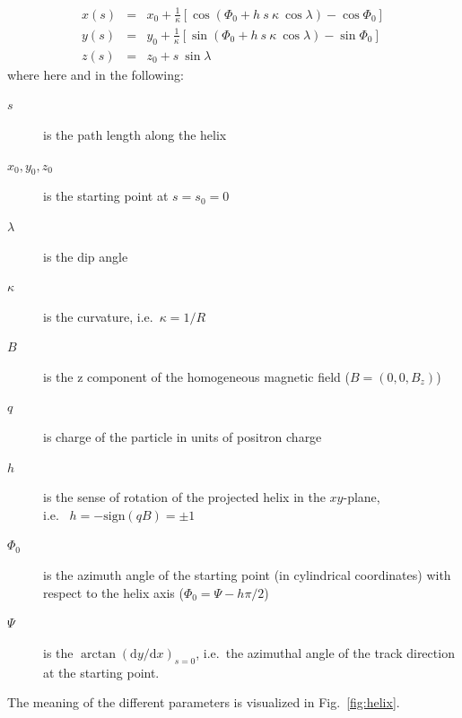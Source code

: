 \documentclass[twoside]{article}
\begin{document}
\begin{eqnarray}
    x(s) & = & x_0 + \frac{1}{\kappa} [\cos(\Phi_0 + h\ s\ \kappa\ \cos\lambda) - \cos\Phi_0] \label{eq:xs} \\
    y(s) & = & y_0 + \frac{1}{\kappa} [\sin(\Phi_0 + h\ s\ \kappa\ \cos\lambda) - \sin\Phi_0] \label{eq:ys} \\
    z(s) & = & z_0 + s\ \sin\lambda \label{eq:zs}
\end{eqnarray}
where here and in the following:
\begin{description}
\item[$s$] is the path length along the helix
\item[$x_0, y_0, z_0$] is the starting point at $s = s_0 = 0$
\item[$\lambda$] is the dip angle
\item[$\kappa$] is the curvature, i.e.~$\kappa = 1/R$
\item[$B$] is the z component of the homogeneous magnetic field ($B = (0, 0, B_z)$)
\item[$q$] is charge of the particle in units of positron charge
\item[$h$] is the sense of rotation of the projected helix in the $xy$-plane,\\
           i.e.~ $h = -\mathrm{sign}(q B) = \pm 1$
\item[$\Phi_0$] is the azimuth angle of the starting point (in
                cylindrical coordinates) with respect to the helix axis ($\Phi_0 =
                \Psi - h \pi/2$)
\item[$\Psi$] is the $\arctan(\mathrm{d}y/\mathrm{d}x)_{s = 0}$,
              i.e.~the azimuthal angle of the track direction at the starting point.
\end{description}
The meaning of the different parameters is visualized in Fig.~\ref{fig:helix}.
\end{document}
